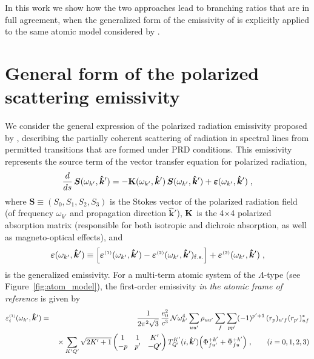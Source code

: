 \documentclass[preprint]{aastex}
\newcommand{\<}{{\kern-5pt}}
\newcommand{\thrj}[6]{\biggl(
	\begin{matrix}
	#1&#2&#3\\
	#4&#5&#6\\
	\end{matrix}\biggr)}
\newcommand{\apx}[1]{^{\mbox{\tiny{(#1)}}}}
\begin{document}
In this work we show how the two approaches lead to branching ratios
that are in full agreement, when the generalized form of the emissivity
of \cite{Ca17} is explicitly applied to the same atomic model considered by
\cite{Bo17}.

\section{General form of the polarized scattering emissivity}

We consider the general expression of the polarized radiation emissivity 
proposed by \cite{Ca17}, describing the partially coherent 
scattering of radiation in spectral lines from permitted 
transitions that are formed under PRD conditions. This
emissivity represents the source term of the vector transfer 
equation for polarized radiation,
%
\begin{equation} \label{eq:RT.gen}
\frac{d}{ds}\,\bm{S}(\omega_{k'},\bm{\hat k}') 
= -{\bf K}(\omega_{k'},\bm{\hat k}')\,
	\bm{S}(\omega_{k'},\bm{\hat k}')
+\bm{\varepsilon}(\omega_{k'},\bm{\hat k}')\;,
\end{equation}
%
where $\bm{S}\equiv(S_0,S_1,S_2,S_3)$ is the Stokes vector of the
polarized radiation field (of frequency $\omega_{k'}$ and propagation
direction $\bm{\hat k}'$), $\bf K$ is the 4$\times$4 polarized 
absorption matrix (responsible for both isotropic and dichroic 
absorption, as well as magneto-optical effects), and
%
\begin{equation} \label{eq:new.emiss}
\bm{\varepsilon}(\omega_{k'},\bm{\hat k}')
	\equiv \Bigl[\bm{\varepsilon}\apx{1}(\omega_{k'},\bm{\hat k}')
	-\bm{\varepsilon}\apx{2}(\omega_{k'},\bm{\hat k}')_{\rm f.s.}
	\Bigr]
+\bm{\varepsilon}\apx{2}(\omega_{k'},\bm{\hat k}')\;,
\end{equation}
%
is the generalized emissivity.
%
For a multi-term atomic system of the $\Lambda$-type (see 
Figure~\ref{fig:atom_model}), the first-order emissivity 
\emph{in the atomic frame of reference} is given by
%
\begin{eqnarray} \label{eq:incoherent.flat}
\varepsilon\apx{1}_i(\omega_{k'},\bm{\hat k}')
&=& \frac{1}{2\pi^2\sqrt3}\,\frac{e_0^2}{c^3}\,
	{\cal N}\omega_{k'}^4
	\sum_{uu'}\rho_{uu'}\sum_{f}\sum_{pp'}(-1)^{p'+1}\,
	(r_p)_{u'f}(r_{p'})_{uf}^* \\
&&{}\times
	\sum_{K'Q'}\sqrt{2K'+1}\,\thrj{1}{1}{K'}{-p}{p'}{-Q'}\,
	T^{K'}_{Q'}(i,\bm{\hat k}')
	\Bigl(
	\Phi_{fu'}^{+k'} + \bar\Phi_{fu}^{+k'}
	\Bigr)\;,\qquad (i=0,1,2,3) \nonumber
\end{eqnarray}
\end{document}

